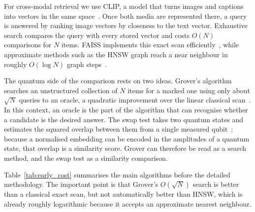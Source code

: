 
For cross-modal retrieval we use CLIP, a model that turns images and captions
into vectors in the same space~\cite{radford2021clip}. Once both media are
represented there, a query is answered by ranking image vectors by closeness to
the text vector. Exhaustive search compares the query with every stored vector
and costs $O(N)$ comparisons for $N$ items. FAISS implements this exact scan
efficiently~\cite{johnson2019faiss}, while approximate methods such as the HNSW
graph reach a near neighbour in roughly $O(\log N)$ graph
steps~\cite{malkov2020hnsw}.

The quantum side of the comparison rests on two ideas. Grover's algorithm
searches an unstructured collection of $N$ items for a marked one using only
about $\sqrt{N}$ queries to an oracle, a quadratic improvement over the linear
classical scan~\cite{grover1996}. In this context, an oracle is the part of the
algorithm that can recognise whether a candidate is the desired answer. The swap
test takes two quantum states and estimates the squared overlap between them from
a single measured qubit~\cite{buhrman2001swaptest}; because a normalised
embedding can be encoded in the amplitudes of a quantum state, that overlap is a
similarity score. Grover can therefore be read as a search method, and the swap
test as a similarity comparison.

Table~\ref{tab:early_cost} summarises the main algorithms before the detailed
methodology. The important point is that Grover's $O(\sqrt{N})$ search is better
than a classical exact scan, but not automatically better than HNSW, which is
already roughly logarithmic because it accepts an approximate nearest neighbour.

